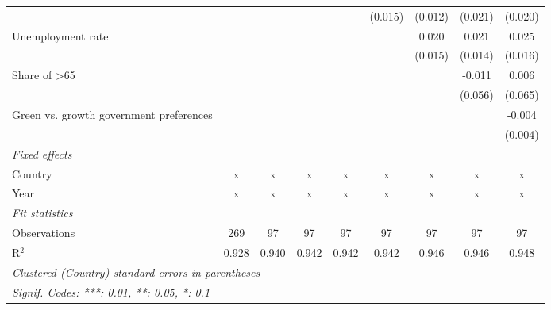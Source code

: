 \begin{table}[htbp]
\begin{tabular}{lcccccccc}
                                              &              &               &             &             & (0.015)      & (0.012)      & (0.021)      & (0.020)\\   
      Unemployment rate                       &              &               &             &             &              & 0.020        & 0.021        & 0.025\\   
                                              &              &               &             &             &              & (0.015)      & (0.014)      & (0.016)\\   
      Share of >65                            &              &               &             &             &              &              & -0.011       & 0.006\\   
                                              &              &               &             &             &              &              & (0.056)      & (0.065)\\   
      Green vs. growth government preferences &              &               &             &             &              &              &              & -0.004\\   
                                              &              &               &             &             &              &              &              & (0.004)\\   
      \emph{Fixed effects}\\
      Country                                 & x            & x             & x           & x           & x            & x            & x            & x\\  
      Year                                    & x            & x             & x           & x           & x            & x            & x            & x\\  
      \midrule \emph{Fit statistics}\\
      Observations                            & 269          & 97            & 97          & 97          & 97           & 97           & 97           & 97\\  
      R$^2$                                   & 0.928        & 0.940         & 0.942       & 0.942       & 0.942        & 0.946        & 0.946        & 0.948\\  
      \midrule
      \multicolumn{9}{l}{\emph{Clustered (Country) standard-errors in parentheses}}\\
      \multicolumn{9}{l}{\emph{Signif. Codes: ***: 0.01, **: 0.05, *: 0.1}}\\
   \end{tabular}
\end{table}


